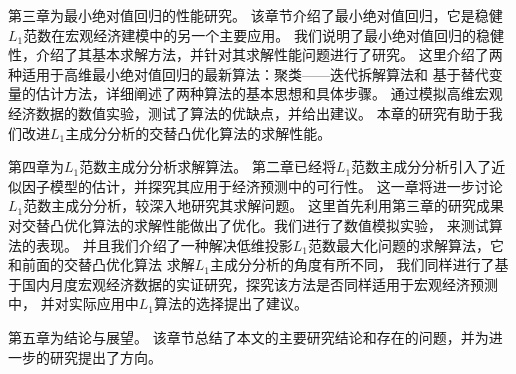 第三章为最小绝对值回归的性能研究。
该章节介绍了最小绝对值回归，它是稳健$L_1$范数在宏观经济建模中的另一个主要应用。
我们说明了最小绝对值回归的稳健性，介绍了其基本求解方法，并针对其求解性能问题进行了研究。
这里介绍了两种适用于高维最小绝对值回归的最新算法：聚类——迭代拆解算法和
基于替代变量的估计方法，详细阐述了两种算法的基本思想和具体步骤。
通过模拟高维宏观经济数据的数值实验，测试了算法的优缺点，并给出建议。
本章的研究有助于我们改进$L_1$主成分分析的交替凸优化算法的求解性能。

第四章为$L_1$范数主成分分析求解算法。
第二章已经将$L_1$范数主成分分析引入了近似因子模型的估计，并探究其应用于经济预测中的可行性。
这一章将进一步讨论$L_1$范数主成分分析，较深入地研究其求解问题。
这里首先利用第三章的研究成果
对交替凸优化算法的求解性能做出了优化。我们进行了数值模拟实验，
来测试算法的表现。
并且我们介绍了一种解决低维投影$L_1$范数最大化问题的求解算法，它和前面的交替凸优化算法
求解$L_1$主成分分析的角度有所不同，
我们同样进行了基于国内月度宏观经济数据的实证研究，探究该方法是否同样适用于宏观经济预测中，
并对实际应用中$L_1$算法的选择提出了建议。

第五章为结论与展望。
该章节总结了本文的主要研究结论和存在的问题，并为进一步的研究提出了方向。
